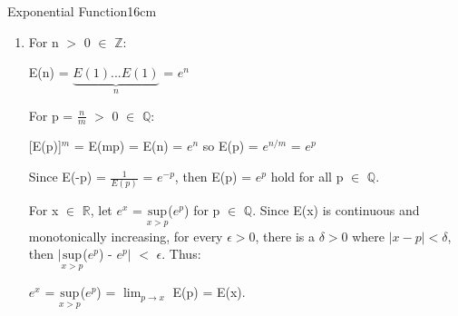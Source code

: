 \begin{definition}{Exponential Function}{16cm}
\begin{enumerate}[label=(\alph*), leftmargin=1.5cm, itemsep=0.1cm]
                \hspace{0.9cm}
                = E(x) $\lim_{h \rightarrow 0}$ $\frac{E(h) - 1}{h}$
                = E(x) ($\lim_{h \rightarrow 0}$ $\frac{E(h)}{h}$
                        - $\lim_{h \rightarrow 0}$ $\frac{1}{h}$)

                \hspace{0.9cm}
                = E(x) ($\lim_{h \rightarrow 0} \frac{1}{h} + 1$
                        - $\lim_{h \rightarrow 0} \frac{1}{h}$)
                = E(x)

            \item For n $>$ 0 $\in$ $\mathbb{Z}$:
            
                \hspace{0.5cm}
                E(n) = $\underbrace{E(1)...E(1)}_n$ = $e^n$

                For p = $\frac{n}{m}$ $>$ 0 $\in$ $\mathbb{Q}$:

                \hspace{0.5cm}
                [E(p)]$^{m}$ = E(mp) = E(n) = $e^n$
                so E(p) = $e^{n/m}$ = $e^p$
                
                Since E(-p) = $\frac{1}{E(p)}$ = $e^{-p}$, then
                E(p) = $e^p$ hold for all p $\in$ $\mathbb{Q}$.

                For x $\in$ $\mathbb{R}$, let $e^x$ =
                $\underset{x > p}{\text{sup}}$($e^p$) for p $\in$ $\mathbb{Q}$.
                Since E(x) is continuous and monotonically increasing,
                for every $\epsilon > 0$, there is a $\delta > 0$ where
                $|x - p| < \delta$, then
                $|$$\underset{x > p}{\text{sup}}$($e^p$) - $e^p$$|$
                $<$ $\epsilon$. Thus:

                \hspace{0.5cm}
                $e^x$ = $\underset{x > p}{\text{sup}}$($e^p$)
                = $\lim_{p \rightarrow x}$ E(p) = E(x).
        \end{enumerate}
    \end{definition}

    \vspace{0.5cm}



